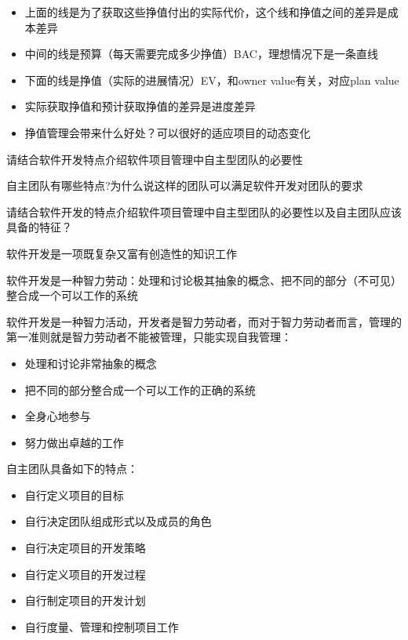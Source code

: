 \begin{solution}
\begin{itemize}
    \item 上面的线是为了获取这些挣值付出的实际代价，这个线和挣值之间的差异是成本差异
    \item 中间的线是预算（每天需要完成多少挣值）BAC，理想情况下是一条直线
    \item 下面的线是挣值（实际的进展情况）EV，和owner value有关，对应plan value
    \item 实际获取挣值和预计获取挣值的差异是进度差异
    \item 挣值管理会带来什么好处？可以很好的适应项目的动态变化
\end{itemize}
\end{solution}



\begin{problem}[2013、2014、2015、2016、2020]
请结合软件开发特点介绍软件项目管理中自主型团队的必要性

自主团队有哪些特点?为什么说这样的团队可以满足软件开发对团队的要求

请结合软件开发的特点介绍软件项目管理中自主型团队的必要性以及自主团队应该具备的特征？
\end{problem}

\begin{solution}
软件开发是一项既复杂又富有创造性的知识工作

软件开发是一种智力劳动：处理和讨论极其抽象的概念、把不同的部分（不可见）整合成一个可以工作的系统

软件开发是一种智力活动，开发者是智力劳动者，而对于智力劳动者而言，管理的第一准则就是智力劳动者不能被管理，只能实现自我管理：
\vspace{-0.8em}
\begin{multicols}{2}
    \begin{itemize}
        \item 处理和讨论非常抽象的概念
        \item 把不同的部分整合成一个可以工作的正确的系统
        \item 全身心地参与
        \item 努力做出卓越的工作
    \end{itemize}
\end{multicols}
\vspace{-1em}

自主团队具备如下的特点：
\vspace{-0.8em}
\begin{multicols}{2}
    \begin{itemize}
        \item 自行定义项目的目标
        \item 自行决定团队组成形式以及成员的角色
        \item 自行决定项目的开发策略
        \item 自行定义项目的开发过程
        \item 自行制定项目的开发计划
        \item 自行度量、管理和控制项目工作
    \end{itemize}
\end{multicols}
\vspace{-1em}
\end{solution}



